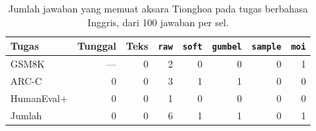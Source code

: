 \begin{table}[htbp]
\centering
\caption{Jumlah jawaban yang memuat aksara Tionghoa pada tugas berbahasa Inggris, dari 100 jawaban per sel.}
\label{tab:korupsi}
\small
\begin{tabular}{lrrrrrrr}
\hline
Tugas & Tunggal & Teks & \texttt{raw} & \texttt{soft} & \texttt{gumbel} & \texttt{sample} & \texttt{moi} \\
\hline
GSM8K & --- & 0 & 2 & 0 & 0 & 0 & 1 \\
ARC-C & 0 & 0 & 3 & 1 & 1 & 0 & 0 \\
HumanEval+ & 0 & 0 & 1 & 0 & 0 & 0 & 0 \\
\hline
Jumlah & 0 & 0 & 6 & 1 & 1 & 0 & 1 \\
\hline
\end{tabular}
\end{table}
